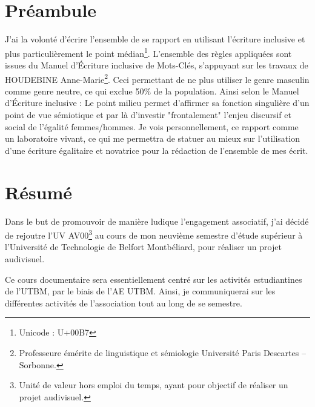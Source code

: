 \documentclass{librairies/lib}
\begin{document}



\newpage
\pagestyle{no_number}

\section*{Préambule}

J'ai la volonté d'écrire l'ensemble de se rapport en utilisant l'écriture inclusive et plus particulièrement le point médian\footnote{Unicode : U+00B7}.
L'ensemble des règles appliquées sont issues du Manuel d’Écriture inclusive\cite{MEI} de Mots-Clés, s'appuyant sur les travaux de HOUDEBINE Anne-Marie\footnote{Professeure émérite de linguistique et sémiologie Université Paris Descartes – Sorbonne.}.
Ceci permettant de ne plus utiliser le genre masculin comme genre neutre, ce qui exclue 50\% de la population.
Ainsi selon le Manuel d’Écriture inclusive : \og Le point milieu permet d'affirmer sa fonction singulière d'un point de vue sémiotique et par là d'investir "frontalement" l'enjeu discursif et social de l'égalité femmes/hommes. \fg{}
Je vois personnellement, ce rapport comme un laboratoire vivant, ce qui me permettra de statuer au mieux sur l'utilisation d'une écriture égalitaire et novatrice pour la rédaction de l'ensemble de mes écrit.


\newpage


\section*{Résumé}

Dans le but de promouvoir de manière ludique l'engagement associatif, j'ai décidé de rejoutre l'UV AV00\footnote{Unité de valeur hors emploi du temps, ayant pour objectif de réaliser un projet audivisuel.} au cours de mon neuvième semestre d'étude supérieur à l'Université de Technologie de Belfort Montbéliard, pour réaliser un projet audivisuel.

Ce cours documentaire sera essentiellement centré sur les activités estudiantines de l'UTBM, par le biais de l'AE UTBM.
Ainsi, je communiquerai sur les différentes activités de l'association tout au long de se semestre.

\newpage
\end{document}
